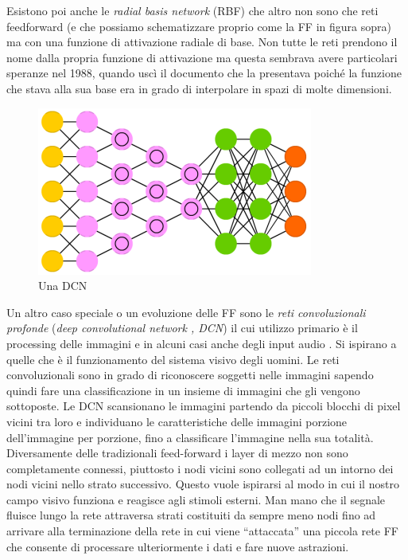Esistono poi anche le \textit{radial basis network} (RBF) che altro non sono che reti feedforward (e che possiamo schematizzare proprio come la FF in figura sopra) ma con una funzione di attivazione radiale di base. Non tutte le reti prendono il nome dalla propria funzione di attivazione ma questa sembrava avere particolari speranze nel 1988, quando uscì il documento che la presentava poiché la funzione che stava alla sua base era in grado di interpolare in spazi di molte dimensioni\cite{broomhead1988radial}.
 
\begin{figure}
\includegraphics[scale=0.7]{media_tesi/DCN.png}
\caption{Una DCN}\label{wrap-fig:1}
\end{figure} 
Un altro caso speciale o un evoluzione delle FF sono le \textit{reti convoluzionali profonde} (\textit{deep convolutional network , DCN}) il cui utilizzo primario è il processing delle immagini e in alcuni casi anche degli input audio \cite{lecun1998gradient}. Si ispirano a quelle che è il funzionamento del sistema visivo degli uomini.
Le reti convoluzionali sono in grado di riconoscere soggetti nelle immagini sapendo quindi fare una classificazione in un insieme di immagini che gli vengono sottoposte. Le DCN scansionano le immagini partendo da piccoli blocchi di pixel vicini tra loro e individuano le caratteristiche delle immagini porzione dell'immagine per porzione, fino a classificare l'immagine nella sua totalità.
Diversamente delle tradizionali feed-forward i layer di mezzo non sono completamente connessi, piuttosto i nodi vicini sono collegati ad un intorno dei nodi vicini nello strato successivo. Questo vuole ispirarsi al modo in cui il nostro campo visivo funziona e reagisce agli stimoli esterni. Man mano che il segnale fluisce lungo la rete attraversa strati costituiti da sempre meno nodi fino ad arrivare alla terminazione della rete in cui viene ``attaccata'' una piccola rete FF che consente di processare ulteriormente i dati e fare nuove astrazioni.


